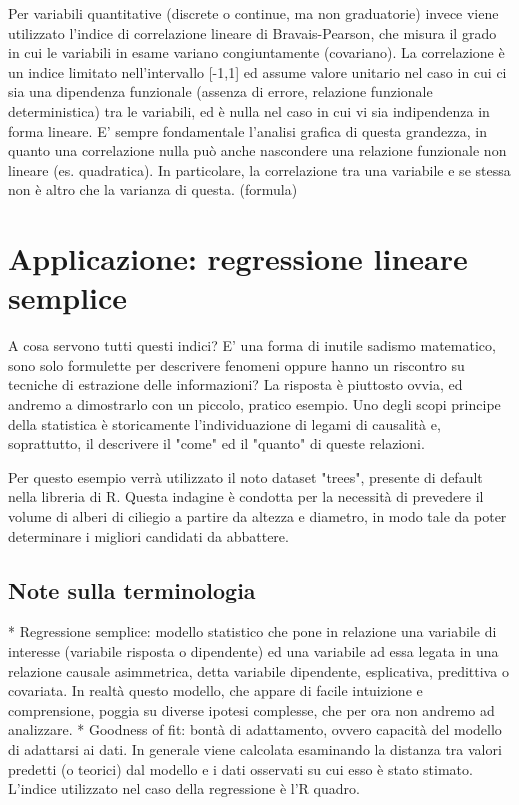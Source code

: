 \documentclass[a4paper]{article}
\begin{document}
Per variabili quantitative (discrete o continue, ma non graduatorie) invece viene utilizzato l'indice di correlazione lineare di Bravais-Pearson, che misura il grado in cui le variabili in esame variano congiuntamente (covariano).
La correlazione \`{e} un indice limitato nell'intervallo [-1,1] ed assume valore unitario nel caso in cui ci sia una dipendenza funzionale (assenza di errore, relazione funzionale deterministica) tra le variabili, ed \`{e} nulla nel caso in cui vi sia indipendenza in forma lineare. E' sempre fondamentale l'analisi grafica di questa grandezza, in quanto una correlazione nulla può anche nascondere una relazione funzionale non lineare (es. quadratica). In particolare, la correlazione tra una variabile e se stessa non \`{e} altro che la varianza di questa.
(formula)


\section{Applicazione: regressione lineare semplice}

A cosa servono tutti questi indici? E' una forma di inutile sadismo matematico, sono solo formulette per descrivere fenomeni oppure hanno un riscontro su tecniche di estrazione delle informazioni? La risposta \`{e} piuttosto ovvia, ed andremo a dimostrarlo con un piccolo, pratico esempio.
Uno degli scopi principe della statistica \`{e} storicamente l'individuazione di legami di causalit\`{a} e, soprattutto, il descrivere il "come" ed il "quanto" di queste relazioni.

Per questo esempio verr\`{a} utilizzato il noto dataset "trees", presente di default nella libreria di R. Questa indagine \`{e} condotta per la necessit\`{a} di prevedere il volume di alberi di ciliegio a partire da altezza e diametro, in modo tale da poter determinare i migliori candidati da abbattere.

\subsection{Note sulla terminologia}
* Regressione semplice: modello statistico che pone in relazione una variabile di interesse (variabile risposta o dipendente) ed una variabile ad essa legata in una relazione causale asimmetrica, detta variabile dipendente, esplicativa, predittiva o covariata. In realt\`{a} questo modello, che appare di facile intuizione e comprensione, poggia su diverse ipotesi complesse, che per ora non andremo ad analizzare.
* Goodness of fit: bont\`{a} di adattamento, ovvero capacit\`{a} del modello di adattarsi ai dati. In generale viene calcolata esaminando la distanza tra valori predetti (o teorici) dal modello e i dati osservati su cui esso \`{e} stato stimato. L'indice utilizzato nel caso della regressione \`{e} l'R quadro.
\end{document}
